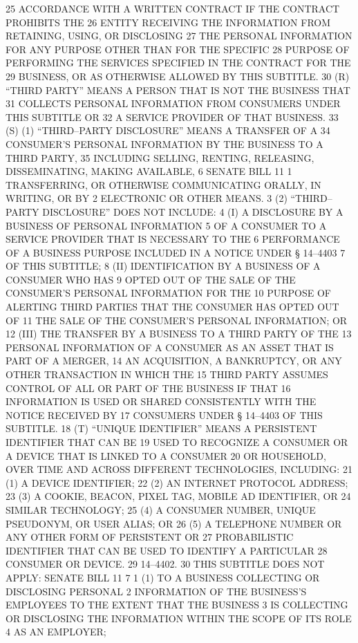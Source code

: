 25 ACCORDANCE WITH A WRITTEN CONTRACT IF THE CONTRACT PROHIBITS THE
26 ENTITY RECEIVING THE INFORMATION FROM RETAINING, USING, OR DISCLOSING
27 THE PERSONAL INFORMATION FOR ANY PURPOSE OTHER THAN FOR THE SPECIFIC
28 PURPOSE OF PERFORMING THE SERVICES SPECIFIED IN THE CONTRACT FOR THE
29 BUSINESS, OR AS OTHERWISE ALLOWED BY THIS SUBTITLE.
30 (R) “THIRD PARTY” MEANS A PERSON THAT IS NOT THE BUSINESS THAT
31 COLLECTS PERSONAL INFORMATION FROM CONSUMERS UNDER THIS SUBTITLE OR
32 A SERVICE PROVIDER OF THAT BUSINESS.
33 (S) (1) “THIRD–PARTY DISCLOSURE” MEANS A TRANSFER OF A
34 CONSUMER’S PERSONAL INFORMATION BY THE BUSINESS TO A THIRD PARTY,
35 INCLUDING SELLING, RENTING, RELEASING, DISSEMINATING, MAKING AVAILABLE,
6 SENATE BILL 11
1 TRANSFERRING, OR OTHERWISE COMMUNICATING ORALLY, IN WRITING, OR BY
2 ELECTRONIC OR OTHER MEANS.
3 (2) “THIRD–PARTY DISCLOSURE” DOES NOT INCLUDE:
4 (I) A DISCLOSURE BY A BUSINESS OF PERSONAL INFORMATION
5 OF A CONSUMER TO A SERVICE PROVIDER THAT IS NECESSARY TO THE
6 PERFORMANCE OF A BUSINESS PURPOSE INCLUDED IN A NOTICE UNDER § 14–4403
7 OF THIS SUBTITLE;
8 (II) IDENTIFICATION BY A BUSINESS OF A CONSUMER WHO HAS
9 OPTED OUT OF THE SALE OF THE CONSUMER’S PERSONAL INFORMATION FOR THE
10 PURPOSE OF ALERTING THIRD PARTIES THAT THE CONSUMER HAS OPTED OUT OF
11 THE SALE OF THE CONSUMER’S PERSONAL INFORMATION; OR
12 (III) THE TRANSFER BY A BUSINESS TO A THIRD PARTY OF THE
13 PERSONAL INFORMATION OF A CONSUMER AS AN ASSET THAT IS PART OF A MERGER,
14 AN ACQUISITION, A BANKRUPTCY, OR ANY OTHER TRANSACTION IN WHICH THE
15 THIRD PARTY ASSUMES CONTROL OF ALL OR PART OF THE BUSINESS IF THAT
16 INFORMATION IS USED OR SHARED CONSISTENTLY WITH THE NOTICE RECEIVED BY
17 CONSUMERS UNDER § 14–4403 OF THIS SUBTITLE.
18 (T) “UNIQUE IDENTIFIER” MEANS A PERSISTENT IDENTIFIER THAT CAN BE
19 USED TO RECOGNIZE A CONSUMER OR A DEVICE THAT IS LINKED TO A CONSUMER
20 OR HOUSEHOLD, OVER TIME AND ACROSS DIFFERENT TECHNOLOGIES, INCLUDING:
21 (1) A DEVICE IDENTIFIER;
22 (2) AN INTERNET PROTOCOL ADDRESS;
23 (3) A COOKIE, BEACON, PIXEL TAG, MOBILE AD IDENTIFIER, OR
24 SIMILAR TECHNOLOGY;
25 (4) A CONSUMER NUMBER, UNIQUE PSEUDONYM, OR USER ALIAS; OR
26 (5) A TELEPHONE NUMBER OR ANY OTHER FORM OF PERSISTENT OR
27 PROBABILISTIC IDENTIFIER THAT CAN BE USED TO IDENTIFY A PARTICULAR
28 CONSUMER OR DEVICE.
29 14–4402.
30 THIS SUBTITLE DOES NOT APPLY:
SENATE BILL 11 7
1 (1) TO A BUSINESS COLLECTING OR DISCLOSING PERSONAL
2 INFORMATION OF THE BUSINESS’S EMPLOYEES TO THE EXTENT THAT THE BUSINESS
3 IS COLLECTING OR DISCLOSING THE INFORMATION WITHIN THE SCOPE OF ITS ROLE
4 AS AN EMPLOYER;
